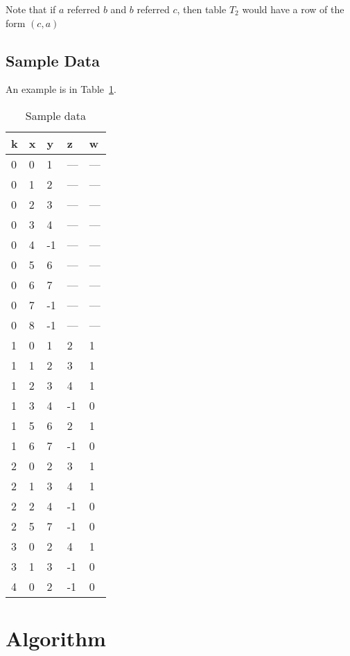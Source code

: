 Note that if \(a\) referred \(b\) and \(b\) referred \(c\), then table \(T_2\)
would have a row of the form \((c, a)\)

\subsection{Sample Data}
An example is in Table~\ref{example_extend}. 
\begin{table}[hp]
\centering
\begin{tabular} {|l|l|l|l|l|} \hline \hline
{\bf k} & {\bf x} & {\bf y} & {\bf z} & {\bf w} \\ \hline
0 & 0 & 1  & --- & --- \\ \hline
0 & 1 & 2  & --- & --- \\ \hline
0 & 2 & 3  & --- & --- \\ \hline
0 & 3 & 4  & --- & --- \\ \hline
0 & 4 & -1 & --- & --- \\\hline
0 & 5 & 6  &  --- & --- \\\hline
0 & 6 & 7  &  --- & --- \\\hline
0 & 7 & -1 &  --- & --- \\\hline
0 & 8 & -1 &  --- & --- \\\hline
\hline  \hline
1 & 0 & 1  & 2  & 1 \\ \hline
1 & 1 & 2  & 3  & 1 \\ \hline
1 & 2 & 3  & 4  & 1 \\ \hline
1 & 3 & 4  & -1 & 0 \\ \hline
1 & 5 & 6  & 2  & 1 \\ \hline
1 & 6 & 7  & -1 & 0 \\ \hline
\hline  \hline
2 & 0 & 2 & 3 & 1 \\ \hline
2 & 1 & 3 & 4 & 1 \\ \hline
2 & 2 & 4 & -1 & 0 \\ \hline
2 & 5 & 7 & -1 & 0 \\ \hline
\hline  \hline
3 & 0 & 2 & 4 & 1 \\ \hline
3 & 1 & 3 & -1 & 0 \\ \hline
\hline  \hline
4 & 0 & 2 & -1 & 0 \\ \hline
\end{tabular}
\caption{Sample data}
\label{example_extend}
\end{table}


\section{Algorithm}

